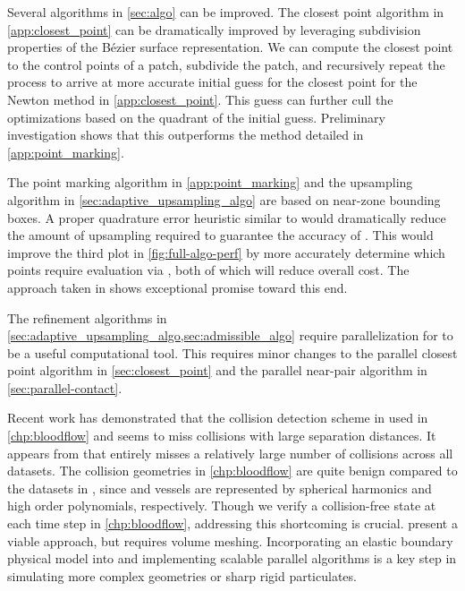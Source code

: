 Several algorithms in \cref{sec:algo} can be improved. 
The closest point algorithm in \cref{app:closest_point} can be dramatically improved by leveraging subdivision properties of the B\'ezier surface representation.
We can compute the closest point to the control points of a patch, subdivide the patch, and recursively repeat the process to arrive at more accurate initial guess for the closest point for the \twod Newton method in \cref{app:closest_point}. 
This guess can further cull the \oned optimizations based on the quadrant of the initial guess.
Preliminary investigation shows that this outperforms the method detailed in \cref{app:point_marking}.

The point marking algorithm in \cref{app:point_marking} and the upsampling algorithm in \cref{sec:adaptive_upsampling_algo} are based on near-zone bounding boxes.
A proper quadrature error heuristic similar to \cite{aT2} would dramatically reduce the amount of upsampling required to guarantee the accuracy of \qbkix. 
This would improve the third plot in \cref{fig:full-algo-perf} by more accurately determine which points require evaluation via \qbkix, both of which will reduce overall cost.
The approach taken in \cite{klinteberg2020quadrature} shows exceptional promise toward this end.

The refinement algorithms in \cref{sec:adaptive_upsampling_algo,sec:admissible_algo} require parallelization for \qbkix to be a useful computational tool. 
This requires minor changes to the parallel closest point algorithm in \cref{sec:closest_point} and the parallel near-pair algorithm in \cref{sec:parallel-contact}.

Recent work \cite{wang2021benchmark} has demonstrated that the collision detection scheme in \cite{Harmon2011} used in \cref{chp:bloodflow} and \cite{lu2019scalable,lu2018parallel} seems to miss collisions with large separation distances. 
It appears from \cite[Section 6]{wang2021benchmark} that \cite{Harmon2011} entirely misses a relatively large number of collisions across all datasets.
The collision geometries in \cref{chp:bloodflow} are quite benign compared to the datasets in \cite{wang2021benchmark}, since \rbcs and vessels are represented by spherical harmonics and high order polynomials, respectively.
Though we verify a collision-free state at each time step in \cref{chp:bloodflow}, addressing this shortcoming is crucial.
\cite{li2020incremental,ferguson2021RigidIPC} present a viable approach, but requires \rbc volume meshing. 
Incorporating an elastic boundary physical model into \cite{li2020incremental,ferguson2021RigidIPC} and implementing scalable parallel algorithms is a key step in simulating more complex geometries or sharp rigid particulates. 
